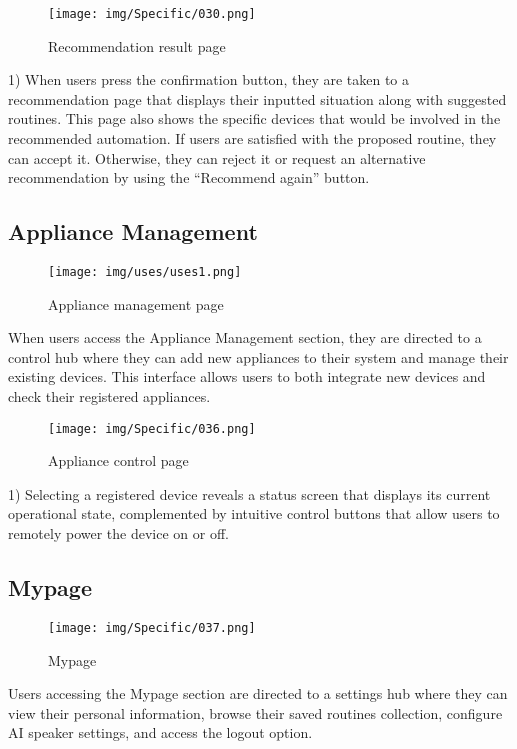 \documentclass[conference]{IEEEtran}
\begin{document}
\vspace{0.7em}

\begin{figure}[h]
    \centering
    \texttt{[image: img/Specific/030.png]}
    \caption{Recommendation result page}
\end{figure}
1) When users press the confirmation button, they are taken to a recommendation page that displays their inputted situation along with suggested routines. This page also shows the specific devices that would be involved in the recommended automation. If users are satisfied with the proposed routine, they can accept it. Otherwise, they can reject it or request an alternative recommendation by using the “Recommend again” button.

\vspace{0.7em} %

\subsection{Appliance Management}
\vspace{0.3em}
\begin{figure}[h]
    \centering
    \texttt{[image: img/uses/uses1.png]}
    \caption{Appliance management page}
\end{figure}
When users access the Appliance Management section, they are directed to a control hub where they can add new appliances to their system and manage their existing devices. This interface allows users to both integrate new devices and check their registered appliances.

\vspace{0.7em}

\begin{figure}[h]
    \centering
    \texttt{[image: img/Specific/036.png]}
    \caption{Appliance control page}
\end{figure}

\newpage

1) Selecting a registered device reveals a status screen that displays its current operational state, complemented by intuitive control buttons that allow users to remotely power the device on or off.

\vspace{0.7em} %

\subsection{Mypage}
\vspace{0.3em}
\begin{figure}[h]
    \centering
    \texttt{[image: img/Specific/037.png]}
    \caption{Mypage}
\end{figure}
Users accessing the Mypage section are directed to a settings hub where they can view their personal information, browse their saved routines collection, configure AI speaker settings, and access the logout option.
\end{document}
